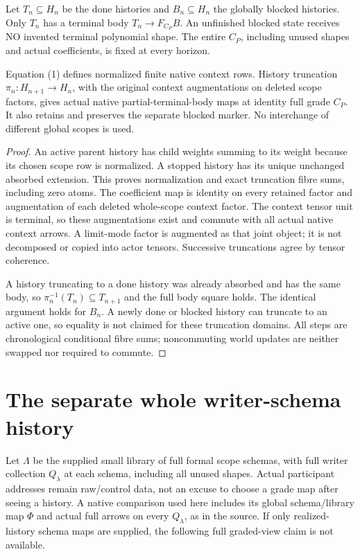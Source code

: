 \documentclass[11pt]{article}
\begin{document}
Let $T_n\subseteq H_n$ be the done histories and $B_n\subseteq H_n$ the
globally blocked histories. Only $T_n$ has a terminal body
$T_n\to F_{C_P}B$. An unfinished blocked state receives NO invented terminal
polynomial shape. The entire $C_P$, including unused shapes and actual
coefficients, is fixed at every horizon.

\begin{theorem}
Equation (1) defines normalized finite native context rows. History truncation
$\pi_n:H_{n+1}\to H_n$, with the original context augmentations on deleted
scope factors, gives actual native partial-terminal-body maps at identity
full grade $C_P$. It also retains and preserves the separate blocked marker.
No interchange of different global scopes is used.
\end{theorem}
\begin{proof}
An active parent history has child weights summing to its weight because its
chosen scope row is normalized. A stopped history has its unique unchanged
absorbed extension. This proves normalization and exact truncation fibre
sums, including zero atoms. The coefficient map is identity on every retained
factor and augmentation of each deleted whole-scope context factor. The
context tensor unit is terminal, so these augmentations exist and commute
with all actual native context arrows. A limit-mode factor is augmented as
that joint object; it is not decomposed or copied into actor tensors.
Successive truncations agree by tensor coherence.

A history truncating to a done history was already absorbed and has the
same body, so $\pi_n^{-1}(T_n)\subseteq T_{n+1}$ and the full body square
holds. The identical argument holds for $B_n$. A newly done or blocked
history can truncate to an active one, so equality is not claimed for these
truncation domains. All steps are chronological conditional fibre sums;
noncommuting world updates are neither swapped nor required to commute.
\end{proof}

\section{The separate whole writer-schema history}
Let $\Lambda$ be the supplied small library of full formal scope schemas,
with full writer collection $Q_\lambda$ at each schema, including all unused
shapes. Actual participant addresses remain raw/control data, not an excuse
to choose a grade map after seeing a history. A native comparison used here
includes its global schema/library map $\Phi$ and actual full arrows on every
$Q_\lambda$, as in the source. If only realized-history schema maps are
supplied, the following full graded-view claim is not available.
\end{document}
